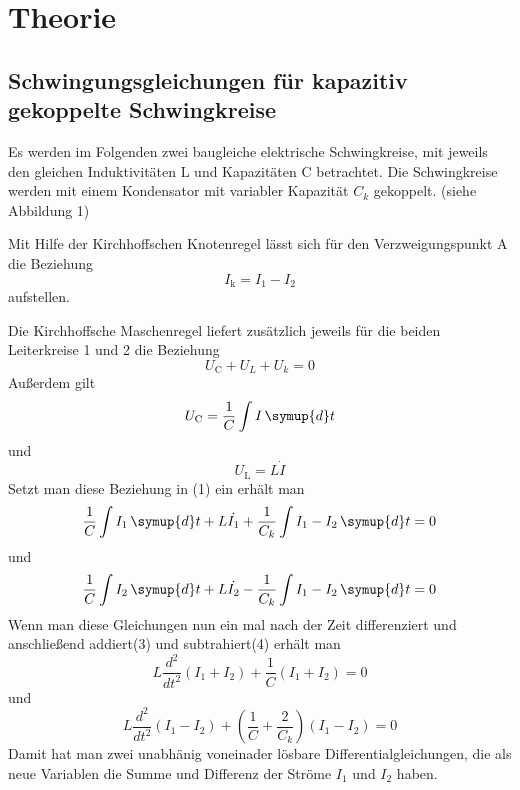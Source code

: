 \section{Theorie}
\label{sec:Theorie}

\subsection{Schwingungsgleichungen für kapazitiv gekoppelte Schwingkreise}
Es werden im Folgenden zwei baugleiche elektrische Schwingkreise, mit jeweils den gleichen Induktivitäten L und Kapazitäten C betrachtet. Die Schwingkreise werden mit 
einem Kondensator mit variabler Kapazität $ C_k $ gekoppelt. (siehe Abbildung 1) %



Mit Hilfe der Kirchhoffschen Knotenregel lässt sich für den Verzweigungspunkt A die Beziehung
\begin{equation}
    I_\text{k} = I_1 - I_2
    \label{eqn:Knotenregel}
\end{equation}
aufstellen.

Die Kirchhoffsche Maschenregel liefert zusätzlich jeweils für die beiden Leiterkreise 1 und 2 die Beziehung
\begin{equation}
    U_\text{C} + U_L + U_k = 0
    \label{eqn:Maschenregel}
\end{equation}
Außerdem gilt
\begin{equation}
    U_\text{C} = \frac{1}{C} \int I \, \symup{d}t
\end{equation}
  und
\begin{equation}
    U_\text{L} = L \dot{I}
\end{equation}
Setzt man diese Beziehung in (1) ein erhält man 
\begin{equation}
    \frac{1}{C} \int I_1 \, \symup{d}t + L \dot{I_1} + \frac{1}{C_k} \int I_1 - I_2 \, \symup{d}t = 0
\end{equation}
und
\begin{equation}
    \frac{1}{C} \int I_2 \, \symup{d}t + L \dot{I_2} - \frac{1}{C_k} \int I_1 - I_2 \, \symup{d}t = 0
\end{equation}
Wenn man diese Gleichungen nun ein mal nach der Zeit differenziert und anschließend addiert(3) und subtrahiert(4) erhält man
\begin{equation}
    L \frac{d^2}{dt^2}(I_1 + I_2) + \frac{1}{C}(I_1 +I_2) = 0
    \label{eqn:Drei}
\end{equation}
und
\begin{equation}
    L \frac{d^2}{dt^2}(I_1 - I_2) + ( \frac{1}{C} + \frac{2}{C_k} ) (I_1 - I_2) = 0
    \label{eqn:Vier}
\end{equation}
Damit hat man zwei unabhänig voneinader lösbare Differentialgleichungen, die als neue Variablen die Summe und Differenz der Ströme $ I_1 $ und $ I_2 $ haben.

